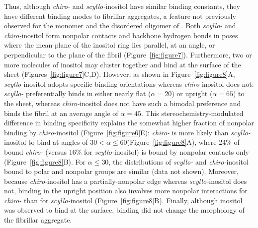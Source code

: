 Thus, although \textit{chiro-} and \textit{scyllo-}inositol have similar binding constants, they have different binding modes to fibrillar aggregates, a feature not previously observed for the monomer and the disordered oligomer of \gafour. Both \textit{scyllo-} and \textit{chiro-}inositol form nonpolar contacts and backbone hydrogen bonds in poses where the mean plane of the inositol ring lies parallel, at an angle, or perpendicular to the plane of the fibril (Figure~\ref{fig:figure7}). Furthermore, two or more molecules of inositol may cluster together and bind at the surface of the sheet (Figures~\ref{fig:figure7}C,D). However, as shown in Figure~\ref{fig:figure8}A, \textit{scyllo-}inositol adopts specific binding orientations whereas \textit{chiro-}inositol does not: \textit{scyllo-} preferentially binds in either nearly flat ($\alpha = 20$\mathdeg) or upright ($\alpha = 65$\mathdeg) to the sheet, whereas \textit{chiro-}inositol does not have such a bimodal preference and binds the fibril at an average angle of $\alpha = 45$\mathdeg. This stereochemistry-modulated difference in binding specificity explains the somewhat higher fraction of nonpolar binding by \textit{chiro-}inositol (Figure~\ref{fig:figure6}E): \textit{chiro-} is more likely than \textit{scyllo-}inositol to bind at angles of $30$\mathdeg $< \alpha \leq 60$\mathdeg (Figure~\ref{fig:figure8}A), where 24\% of bound \textit{chiro-} (versus 16\% for \textit{scyllo-}inositol) is bound by nonpolar contacts only (Figure~\ref{fig:figure8}B). For $\alpha \leq 30$\mathdeg, the distributions of \textit{scyllo-} and \textit{chiro-}inositol bound to polar and nonpolar groups are similar (data not shown). Moreover, because \textit{chiro-}inositol has a partially-nonpolar edge whereas \textit{scyllo-}inositol does not, binding in the upright position also involves more nonpolar interactions for \textit{chiro-} than for \textit{scyllo-}inositol (Figure~\ref{fig:figure8}B). Finally, although inositol was observed to bind at the surface, binding did not change the morphology of the fibrillar aggregate.

